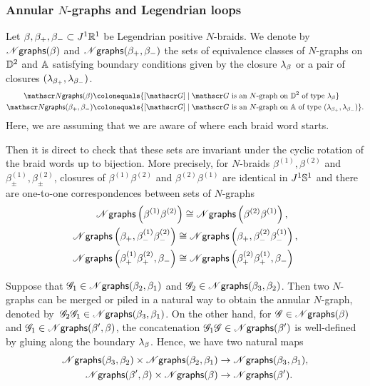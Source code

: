 \subsubsection{Annular $N$-graphs and Legendrian loops}
Let $\beta, \beta_+, \beta_-\subset J^1\mathbb{R}^1$ be Legendrian positive $N$-braids.
We denote by $\mathscr{N}\mathsf{graphs}(\beta)$ and $\mathscr{N}\mathsf{graphs}(\beta_+, \beta_-)$ the sets of equivalence classes of $N$-graphs on $\mathbb{D}^2$ and $\mathbb{A}$ satisfying boundary conditions given by the closure $\lambda_\beta$ or a pair of closures $(\lambda_{\beta_+}, \lambda_{\beta_-})$.
\begin{align*}
\Ngraphs(\beta)&\colonequals
\{[\ngraph]\mid \ngraph\text{ is an $N$-graph on $\disk^2$ of type $\legendrian_\beta$}\}\\
\Ngraphs(\beta_+, \beta_-)&\colonequals
\{[\ngraph]\mid \ngraph\text{ is an $N$-graph on $\annulus$ of type $(\legendrian_{\beta_+}, \legendrian_{\beta_-})$}\}.
\end{align*}
Here, we are assuming that we are aware of where each braid word starts.

Then it is direct to check that these sets are invariant under the cyclic rotation of the braid words up to bijection. More precisely, for $N$-braids $\beta^{(1)}, \beta^{(2)}$ and $\beta^{(1)}_\pm, \beta^{(2)}_\pm$, closures of $\beta^{(1)}\beta^{(2)}$ and $\beta^{(2)}\beta^{(1)}$ are identical in $J^1\mathbb{S}^1$ and there are one-to-one correspondences between sets of $N$-graphs
\begin{align}
\begin{split}
\mathscr{N}\mathsf{graphs}\left(\beta^{(1)}\beta^{(2)}\right) &\cong \mathscr{N}\mathsf{graphs}\left(\beta^{(2)}\beta^{(1)}\right),
\end{split}\\
\begin{split}
\mathscr{N}\mathsf{graphs}\left(\beta_+, \beta^{(1)}_-\beta^{(2)}_-\right) &\cong \mathscr{N}\mathsf{graphs}\left(\beta_+, \beta^{(2)}_-\beta^{(1)}_-\right),\\
\mathscr{N}\mathsf{graphs}\left(\beta^{(1)}_+\beta^{(2)}_+, \beta_-\right) &\cong \mathscr{N}\mathsf{graphs}\left(\beta^{(2)}_+\beta^{(1)}_+, \beta_-\right)
\end{split}
\label{equation:cyclic rotation of word}
\end{align}

Suppose that $\mathscr{G}_1\in\mathscr{N}\mathsf{graphs}(\beta_2,\beta_1)$ and $\mathscr{G}_2\in\mathscr{N}\mathsf{graphs}(\beta_3,\beta_2)$.
Then two $N$-graphs can be merged or piled in a natural way to obtain the annular $N$-graph, denoted by~$\mathscr{G}_2\mathscr{G}_1\in\mathscr{N}\mathsf{graphs}(\beta_3, \beta_1)$.
On the other hand, for $\mathscr{G}\in\mathscr{N}\mathsf{graphs}(\beta)$ and $\mathscr{G}_1\in\mathscr{N}\mathsf{graphs}(\beta', \beta)$, the concatenation $\mathscr{G}_1\mathscr{G}\in\mathscr{N}\mathsf{graphs}(\beta')$ is well-defined by gluing along the boundary $\lambda_\beta$.
Hence, we have two natural maps
\begin{align*}
\mathscr{N}\mathsf{graphs}(\beta_3,\beta_2)\times\mathscr{N}\mathsf{graphs}(\beta_2,\beta_1)&\to \mathscr{N}\mathsf{graphs}(\beta_3,\beta_1),\\
\mathscr{N}\mathsf{graphs}(\beta', \beta)\times\mathscr{N}\mathsf{graphs}(\beta) &\to \mathscr{N}\mathsf{graphs}(\beta').
\end{align*}

